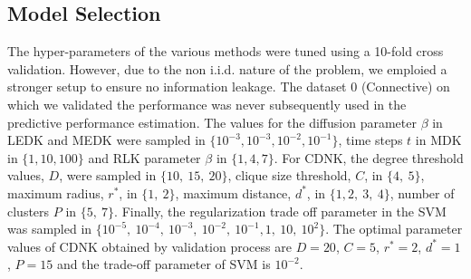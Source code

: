 \documentclass[review]{elsarticle}
\begin{document}
\subsection{Model Selection}
The hyper-parameters of the various methods were tuned using a 10-fold cross validation. However, due to the non i.i.d. nature of the problem, we emploied a stronger setup to ensure no information leakage. The dataset $0$ (Connective) on which we  validated the performance was never subsequently used in the predictive performance estimation. The values for the diffusion parameter $\beta$ in LEDK and MEDK were sampled in $\lbrace 10^{-3}, 10^{-3}, 10^{-2}, 10^{-1} \rbrace$, time steps $t$ in MDK in $\lbrace 1, 10, 100 \rbrace$ and RLK parameter $\beta$ in $\lbrace 1, 4, 7 \rbrace$. For CDNK, the degree threshold values, $D$, were sampled in $\lbrace 10,\ 15,\ 20 \rbrace$, clique size threshold, $C$, in $\lbrace 4,\ 5 \rbrace$, maximum radius, $r^*$, in $\lbrace 1,\ 2 \rbrace$, maximum distance, $d^*$, in $\lbrace 1, 2,\ 3,\ 4 \rbrace$, number of clusters $P$ in $\lbrace 5,\ 7 \rbrace$. Finally, the regularization trade off parameter in the SVM was sampled in $\lbrace 10^{-5},  \ 10^{-4}, \ 10^{-3},\ 10^{-2},\ 10^{-1}, 1,\ 10,\ 10^2 \rbrace$. The optimal parameter values of CDNK obtained by validation process are $D = 20$, $C=5$, $r^*=2$, $d^*=1$, $P=15$ and the trade-off parameter of SVM is $10^{-2}$.
\end{document}
